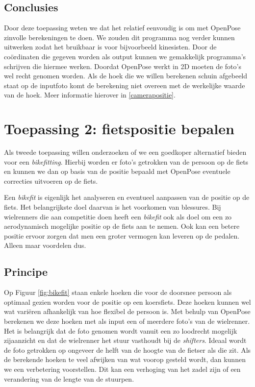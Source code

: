 \documentclass[a4paper,twoside,kulak]{kulakreport}
\begin{document}
\subsection{Conclusies}
Door deze  toepassing weten we dat het relatief eenvoudig is om met OpenPose zinvolle berekeningen te doen. We zouden dit programma nog verder kunnen uitwerken zodat het bruikbaar is voor bijvoorbeeld kinesisten. Door de coördinaten die gegeven worden als output kunnen we gemakkelijk programma's schrijven die hiermee werken. Doordat OpenPose werkt in 2D moeten de foto's wel recht genomen worden. Als de hoek die we willen berekenen schuin afgebeeld staat op de inputfoto komt de berekening niet overeen met de werkelijke waarde van de hoek. Meer informatie hierover in \ref{camerapositie}.


\section{Toepassing 2: fietspositie bepalen}
Als tweede toepassing willen onderzoeken of we een goedkoper alternatief bieden voor een \textit{bikefitting}. Hierbij worden er foto's getrokken van de persoon op de fiets en kunnen we dan op basis van de positie bepaald met OpenPose eventuele correcties uitvoeren op de fiets.

Een \emph{bikefit} is eigenlijk het analyseren en eventueel aanpassen van de positie op de fiets. Het belangrijkste doel daarvan is het voorkomen van blessures. Bij wielrenners die aan competitie doen heeft een \emph{bikefit} ook als doel om een zo aerodynamisch mogelijke positie op de fiets aan te nemen. Ook kan een betere positie ervoor zorgen dat men een groter vermogen kan leveren op de pedalen. Alleen maar voordelen dus.

\subsection{Principe}

Op Figuur \ref{fig:bikefit} staan enkele hoeken die voor de doorsnee persoon als optimaal gezien worden voor de positie op een koersfiets. Deze hoeken kunnen wel wat variëren afhankelijk van hoe flexibel de persoon is. Met behulp van OpenPose berekenen we deze hoeken met als input een of meerdere foto's van de wielrenner. Het is belangrijk dat de foto genomen wordt vanuit een zo loodrecht mogelijk zijaanzicht en dat de wielrenner het stuur vasthoudt bij de \emph{shifters}. Ideaal wordt de foto getrokken op ongeveer de helft van de hoogte van de fietser als die zit. Als de berekende hoeken te veel afwijken van wat voorop gesteld wordt, dan kunnen we een verbetering voorstellen. Dit kan een verhoging van het zadel zijn of een verandering van de lengte van de stuurpen.
\end{document}
